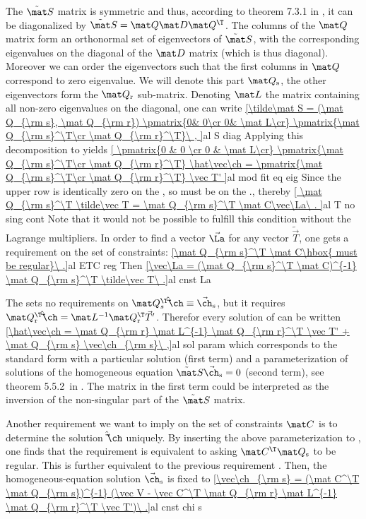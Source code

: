 The $\tilde\mat S$ matrix is symmetric and thus, according to theorem 7.3.1 in , it can be diagonalized by $\tilde\mat S = \mat Q \mat D \mat Q^\T$. The columns of the $\mat Q$ matrix form an orthonormal set of eigenvectors of $\tilde\mat S$, with the corresponding eigenvalues on the diagonal of the $\mat D$ matrix (which is thus diagonal). Moreover we can order the eigenvectors such that the first columns in $\mat Q$ correspond to zero eigenvalue. We will denote this part $\mat Q_{\rm s}$, the other eigenvectors form the $\mat Q_{\rm r}$ sub-matrix. Denoting $\mat L$ the matrix containing all non-zero eigenvalues on the diagonal, one can write
\eqref{\tilde\mat S = (\mat Q_{\rm s}, \mat Q_{\rm r})
	\pmatrix{0& 0\cr 0& \mat L\cr}
	\pmatrix{\mat Q_{\rm s}^\T\cr \mat Q_{\rm r}^\T}\ ,
}{al S diag}
Applying this decomposition to  yields
\eqref{
	\pmatrix{0 & 0 \cr 0 & \mat L\cr} \pmatrix{\mat Q_{\rm s}^\T\cr \mat Q_{\rm r}^\T} \hat\vec\ch
	= \pmatrix{\mat Q_{\rm s}^\T\cr \mat Q_{\rm r}^\T} \vec T'
}{al mod fit eq eig}
Since the upper row is identically zero on the \lhs, so must be on the \rhs., thereby
\eqref{
	\mat Q_{\rm s}^\T \tilde\vec T = \mat Q_{\rm s}^\T \mat C\vec\La\ .
}{al T no sing cont}
Note that it would not be possible to fulfill this condition without the Lagrange multipliers. In order to find a vector $\vec\La$ for any vector $\tilde\vec T$, one gets a requirement on the set of constraints:
\eqref{\mat Q_{\rm s}^\T \mat C\hbox{ must be regular}\ .}{al ETC reg}
Then
\eqref{\vec\La = (\mat Q_{\rm s}^\T \mat C)^{-1} \mat Q_{\rm s}^\T \tilde\vec T\ .}{al cnst La}

The  sets no requirements on $\mat Q_{s}^\T \hat\vec\ch \equiv \vec\ch_{\rm s}$, but it requires $\mat Q_{\rm r}^\T \hat\vec\ch = \mat L^{-1} \mat Q_{\rm r}^\T \vec T'$. Therefor every solution of  can be written
\eqref{\hat\vec\ch =  \mat Q_{\rm r} \mat L^{-1} \mat Q_{\rm r}^\T \vec T' + \mat Q_{\rm s} \vec\ch_{\rm s}\ ,}{al sol param}
which corresponds to the standard form with a particular solution (first term) and a parameterization of solutions of the homogeneous equation $\tilde\mat S \vec\ch_{\rm s} = 0$ (second term), see theorem 5.5.2~in . The matrix in the first term could be interpreted as the inversion of the non-singular part of the $\tilde\mat S$ matrix.

Another requirement we want to imply on the set of constraints $\mat C$ is to determine the solution $\hat\vec\ch$ uniquely. By inserting the above parameterization to , one finds that the requirement is equivalent to asking $\mat C^\T \mat Q_{\rm s}$ to be regular. This is further equivalent to the previous requirement . Then, the homogeneous-equation solution $\vec\ch_{\rm s}$ is fixed to
\eqref{\vec\ch_{\rm s} = (\mat C^\T \mat Q_{\rm s})^{-1} (\vec V - \vec C^\T \mat Q_{\rm r} \mat L^{-1} \mat Q_{\rm r}^\T \vec T')\ .}{al cnst chi s}

